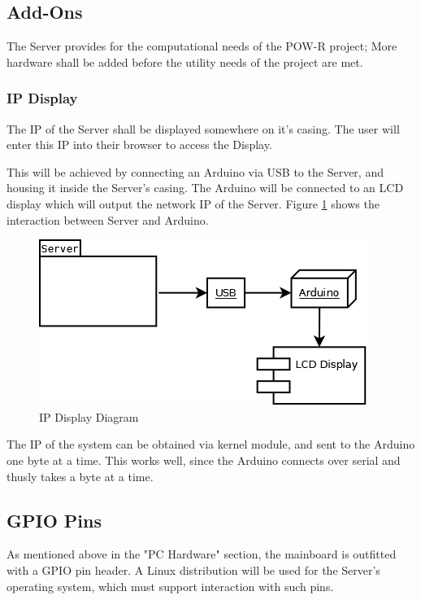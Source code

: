 
\subsection{Add-Ons}
The Server provides for the computational needs of the POW-R project; 
More hardware shall be added before the utility needs of the project are met.

\subsubsection{IP Display}
The IP of the Server shall be displayed somewhere on it's casing. 
The user will enter this IP into their browser to access the Display.

This will be achieved by connecting an Arduino via USB to the Server, and housing it inside the Server's casing. 
The Arduino will be connected to an LCD display which will output the network IP of the Server. 
Figure \ref{ArduinoLCD} shows the interaction between Server and Arduino.

\begin{figure}
\centering
\includegraphics[scale=0.5]{Hardware/images/ArduinoLCD.png}
\caption{IP Display Diagram}
\label{ArduinoLCD}
\end{figure}

The IP of the system can be obtained via kernel module, and sent to the Arduino one byte at a time. 
This works well, since the Arduino connects over serial and thusly takes a byte at a time.

\subsection{GPIO Pins}
As mentioned above in the "PC Hardware" section, the mainboard is outfitted with a GPIO pin header. 
A Linux distribution will be used for the Server's operating system, which must support interaction with such pins. 

